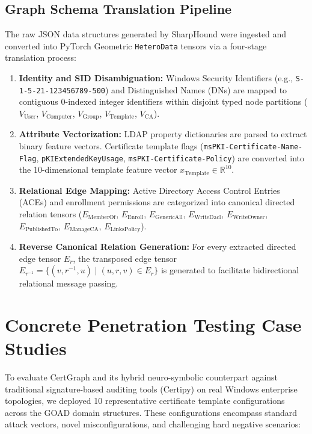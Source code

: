 \subsection{Graph Schema Translation Pipeline}
The raw JSON data structures generated by SharpHound were ingested and converted into PyTorch Geometric \texttt{HeteroData} tensors via a four-stage translation process:
\begin{enumerate}
    \item \textbf{Identity and SID Disambiguation:} Windows Security Identifiers (e.g., \texttt{S-1-5-21-123456789-500}) and Distinguished Names (DNs) are mapped to contiguous 0-indexed integer identifiers within disjoint typed node partitions ($V_{\text{User}}$, $V_{\text{Computer}}$, $V_{\text{Group}}$, $V_{\text{Template}}$, $V_{\text{CA}}$).
    \item \textbf{Attribute Vectorization:} LDAP property dictionaries are parsed to extract binary feature vectors. Certificate template flags (\texttt{msPKI-}\allowbreak\texttt{Certificate-}\allowbreak\texttt{Name-}\allowbreak\texttt{Flag}, \texttt{pKIExtendedKeyUsage}, \texttt{msPKI-}\allowbreak\texttt{Certificate-}\allowbreak\texttt{Policy}) are converted into the 10-dimensional template feature vector $x_{\text{Template}} \in \mathbb{R}^{10}$.
    \item \textbf{Relational Edge Mapping:} Active Directory Access Control Entries (ACEs) and enrollment permissions are categorized into canonical directed relation tensors ($E_{\text{MemberOf}}$, $E_{\text{Enroll}}$, $E_{\text{GenericAll}}$, $E_{\text{WriteDacl}}$, $E_{\text{WriteOwner}}$, $E_{\text{PublishedTo}}$, $E_{\text{ManageCA}}$, $E_{\text{LinksPolicy}}$).
    \item \textbf{Reverse Canonical Relation Generation:} For every extracted directed edge tensor $E_r$, the transposed edge tensor $E_{r^{-1}} = \{(v, r^{-1}, u) \mid (u, r, v) \in E_r\}$ is generated to facilitate bidirectional relational message passing.
\end{enumerate}

\section{Concrete Penetration Testing Case Studies}
To evaluate CertGraph and its hybrid neuro-symbolic counterpart against traditional signature-based auditing tools (Certipy) on real Windows enterprise topologies, we deployed 10 representative certificate template configurations across the GOAD domain structures. These configurations encompass standard attack vectors, novel misconfigurations, and challenging hard negative scenarios:

